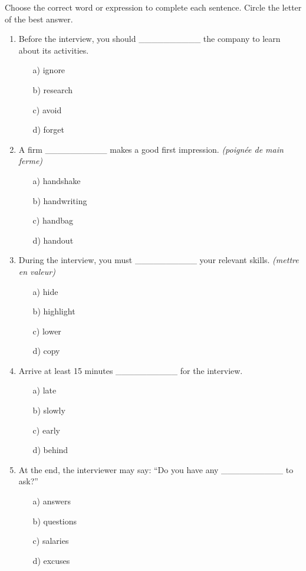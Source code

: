\documentclass[11pt]{article}
\begin{document}
\begin{exercice}
Choose the correct word or expression to complete each sentence. Circle the letter of the best answer.
\begin{enumerate}
    \item Before the interview, you should \_\_\_\_\_\_\_\_\_\_ the company to learn about its activities.
    \begin{enumerate}
        \item[a)] ignore \item[b)] research \item[c)] avoid \item[d)] forget
    \end{enumerate}
    \item A firm \_\_\_\_\_\_\_\_\_\_ makes a good first impression. \emph{(poignée de main ferme)}
    \begin{enumerate}
        \item[a)] handshake \item[b)] handwriting \item[c)] handbag \item[d)] handout
    \end{enumerate}
    \item During the interview, you must \_\_\_\_\_\_\_\_\_\_ your relevant skills. \emph{(mettre en valeur)}
    \begin{enumerate}
        \item[a)] hide \item[b)] highlight \item[c)] lower \item[d)] copy
    \end{enumerate}
    \item Arrive at least 15 minutes \_\_\_\_\_\_\_\_\_\_ for the interview.
    \begin{enumerate}
        \item[a)] late \item[b)] slowly \item[c)] early \item[d)] behind
    \end{enumerate}
    \item At the end, the interviewer may say: ``Do you have any \_\_\_\_\_\_\_\_\_\_ to ask?''
    \begin{enumerate}
        \item[a)] answers \item[b)] questions \item[c)] salaries \item[d)] excuses
    \end{enumerate}
\end{enumerate}
\end{exercice}
\end{document}
